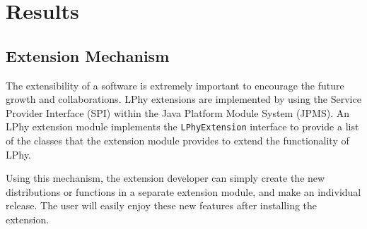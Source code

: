 \documentclass[10pt,letterpaper,table]{article}
\begin{document}
{%






\section*{Results}

\subsection*{Extension Mechanism}

The extensibility of a software is extremely important to encourage 
the future growth and collaborations. 
LPhy extensions are implemented by using the Service Provider Interface (SPI) 
within the Java Platform Module System (JPMS). 
An LPhy extension module implements the \texttt{LPhyExtension} interface 
to provide a list of the classes that the extension module provides 
to extend the functionality of LPhy.

Using this mechanism, the extension developer can simply create the new 
distributions or functions in a separate extension module, and make an individual release.
The user will easily enjoy these new features after installing the extension.


}
\end{document}
